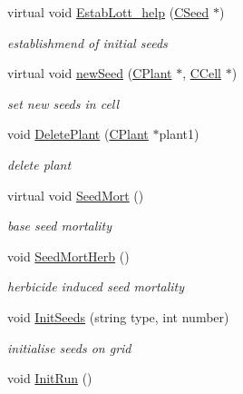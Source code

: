 \begin{DoxyCompactItemize}
virtual void \mbox{\hyperlink{class_c_herbicide_effect_env_a6c75efbe3b28138bbe417e52d5a3f523}{Estab\+Lott\+\_\+help}} (\mbox{\hyperlink{class_c_seed}{C\+Seed}} $\ast$)
\begin{DoxyCompactList}\small\item\em establishmend of initial seeds \end{DoxyCompactList}\item 
virtual void \mbox{\hyperlink{class_c_herbicide_effect_env_aebf7af3b70caeba866e3ca2c8c0262f7}{new\+Seed}} (\mbox{\hyperlink{class_c_plant}{C\+Plant}} $\ast$, \mbox{\hyperlink{class_c_cell}{C\+Cell}} $\ast$)
\begin{DoxyCompactList}\small\item\em set new seeds in cell \end{DoxyCompactList}\item 
\mbox{\label{class_c_herbicide_effect_env_ae8dbbf008905283e45fef1ed10d4ce3b}} 
void \mbox{\hyperlink{class_c_herbicide_effect_env_ae8dbbf008905283e45fef1ed10d4ce3b}{Delete\+Plant}} (\mbox{\hyperlink{class_c_plant}{C\+Plant}} $\ast$plant1)
\begin{DoxyCompactList}\small\item\em delete plant \end{DoxyCompactList}\item 
virtual void \mbox{\hyperlink{class_c_herbicide_effect_env_aa325ab8688e1e1bbe060da4b2031cd44}{Seed\+Mort}} ()
\begin{DoxyCompactList}\small\item\em base seed mortality \end{DoxyCompactList}\item 
void \mbox{\hyperlink{class_c_herbicide_effect_env_a88180a174d738b7a5e2e3bdcdd4b8635}{Seed\+Mort\+Herb}} ()
\begin{DoxyCompactList}\small\item\em herbicide induced seed mortality \end{DoxyCompactList}\item 
void \mbox{\hyperlink{class_c_herbicide_effect_env_a5832c475d9cda7d106b1750ce197843d}{Init\+Seeds}} (string type, int number)
\begin{DoxyCompactList}\small\item\em initialise seeds on grid \end{DoxyCompactList}\item 
void \mbox{\hyperlink{class_c_herbicide_effect_env_a307a82e619105086fd02eca98c48f8b6}{Init\+Run}} ()

\end{DoxyCompactItemize}
